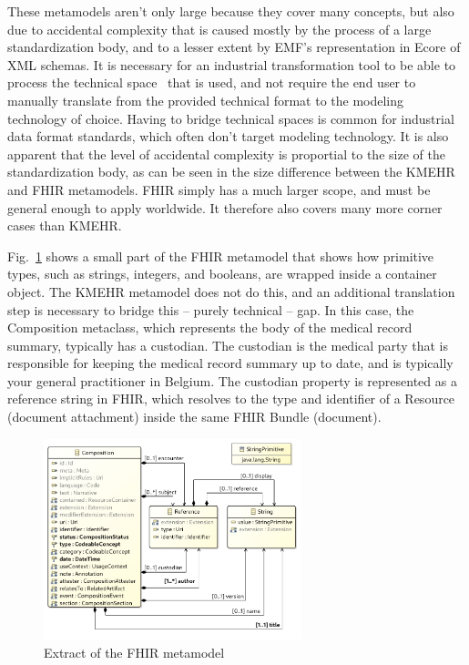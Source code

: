 \documentclass[
twocolumn,
]{ceurart}
\begin{document}
These metamodels aren't only large because they cover many concepts, but also
due to accidental complexity that is caused mostly by the process of a large
standardization body, and to a lesser extent by EMF's representation in Ecore
of XML schemas. It is necessary for an industrial transformation tool to be
able to process the technical space~\cite{conf/gttse/Bezivin2005} that is
used, and not require the end user to manually translate from the provided
technical format to the modeling technology of choice.
Having to bridge technical spaces is common for industrial data format standards,
which often don't target modeling technology. It is also apparent that the
level of accidental complexity is proportial to the size of the standardization
body, as can be seen in the size difference between the KMEHR and FHIR
metamodels. FHIR simply has a much larger scope, and must be general enough
to apply worldwide. It therefore also covers many more corner cases than
KMEHR.

Fig.~\ref{fig:fhirextract} shows
a small part of the FHIR metamodel that shows how primitive types, such as
strings, integers, and booleans, are wrapped inside a container object.
The KMEHR metamodel does not do this, and an additional translation step
is necessary to bridge this -- purely technical -- gap. In this case,
the Composition metaclass, which represents the body of the medical record
summary, typically has a custodian. The custodian is the medical party that
is responsible for keeping the medical record summary up to date, and is
typically your general practitioner in Belgium. The custodian property is
represented as a reference string in FHIR, which resolves to the type and
identifier of a Resource (document attachment) inside the same FHIR
Bundle (document).

\begin{figure}[ht]
\centerline{
\includegraphics[width=7.5cm]{figures/fhirextract}}
\caption{Extract of the FHIR metamodel}
\label{fig:fhirextract}
\end{figure}
\end{document}
